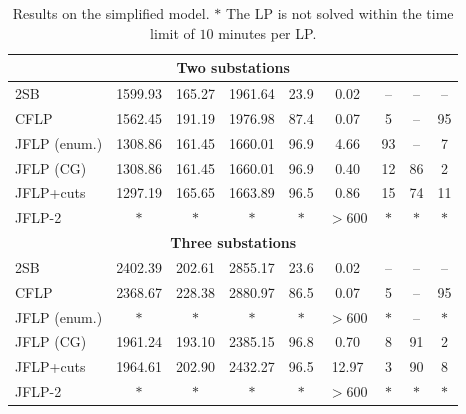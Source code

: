 \documentclass{article}
\begin{document}
\begin{table}[H]
\begin{tabular}{lcccccccc}
\midrule
\multicolumn{9}{c}{\textbf{Two substations}} \\
\midrule
2SB & 1599.93 & 165.27 & 1961.64 & 23.9 & 0.02 & -- & -- & -- \\
CFLP & 1562.45 & 191.19 & 1976.98 & 87.4 & 0.07 & 5 & -- & 95 \\
JFLP (enum.) & 1308.86 & 161.45 & 1660.01 & 96.9 & 4.66 & 93 & -- & 7 \\
JFLP (CG) & 1308.86 & 161.45 & 1660.01 & 96.9 & 0.40 & 12 & 86 & 2 \\
JFLP+cuts & 1297.19 & 165.65 & 1663.89 & 96.5 & 0.86 & 15 & 74 & 11 \\
JFLP-2 & $\ast$ & $\ast$ & $\ast$ & $\ast$ & $> 600$ & $\ast$ & $\ast$ & $\ast$ \\
\midrule
\multicolumn{9}{c}{\textbf{Three substations}} \\
\midrule
2SB & 2402.39 & 202.61 & 2855.17 & 23.6 & 0.02 & -- & -- & -- \\
CFLP & 2368.67 & 228.38 & 2880.97 & 86.5 & 0.07 & 5 & -- & 95 \\
JFLP (enum.) & $\ast$ & $\ast$ & $\ast$ & $\ast$ & $> 600$ & $\ast$ & -- & $\ast$ \\
JFLP (CG) & 1961.24 & 193.10 & 2385.15 & 96.8 & 0.70 & 8 & 91 & 2 \\
JFLP+cuts & 1964.61 & 202.90 & 2432.27 & 96.5 & 12.97 & 3 & 90 & 8 \\
JFLP-2 & $\ast$ & $\ast$ & $\ast$ & $\ast$ & $> 600$ & $\ast$ & $\ast$ & $\ast$ \\
\bottomrule
\end{tabular}
\caption{Results on the simplified model. $\ast$ The LP is not solved within the time limit of $10$ minutes per LP.}
\label{tab:simplified-model-results}
\end{table}
\end{document}
